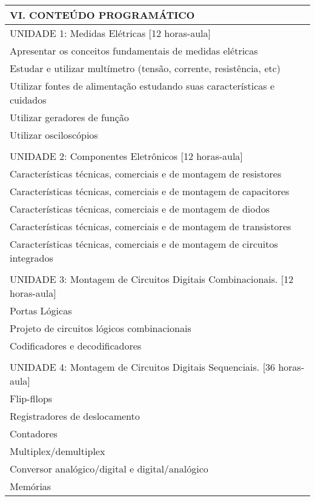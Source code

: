 \documentclass[12pt]{article}
\begin{document}
\begin{longtable}{|L{1.025\textwidth}|} \hline
%
{\bf VI. CONTEÚDO PROGRAMÁTICO } \\ \hline
UNIDADE 1: Medidas Elétricas [12 horas-aula]\\
Apresentar os conceitos fundamentais de medidas elétricas\\
Estudar e utilizar multímetro (tensão, corrente, resistência, etc)\\
Utilizar fontes de alimentação estudando suas características e cuidados\\
Utilizar geradores de função\\
Utilizar osciloscópios\\
\\
UNIDADE 2: Componentes Eletrônicos [12 horas-aula]\\
Características técnicas, comerciais e de montagem de resistores\\
Características técnicas, comerciais e de montagem de capacitores\\
Características técnicas, comerciais e de montagem de diodos\\
Características técnicas, comerciais e de montagem de transistores\\
Características técnicas, comerciais e de montagem de circuitos integrados\\
\\
UNIDADE 3: Montagem de Circuitos Digitais Combinacionais. [12 horas-aula]\\
Portas Lógicas\\
Projeto de circuitos lógicos combinacionais\\
Codificadores e decodificadores\\
\\
UNIDADE 4: Montagem de Circuitos Digitais Sequenciais. [36 horas-aula]\\
Flip-fllops\\
Registradores de deslocamento\\
Contadores\\
Multiplex/demultiplex\\
Conversor analógico/digital e digital/analógico\\
Memórias
\\ \hline
\end{longtable} 

\newpage
\end{document}
